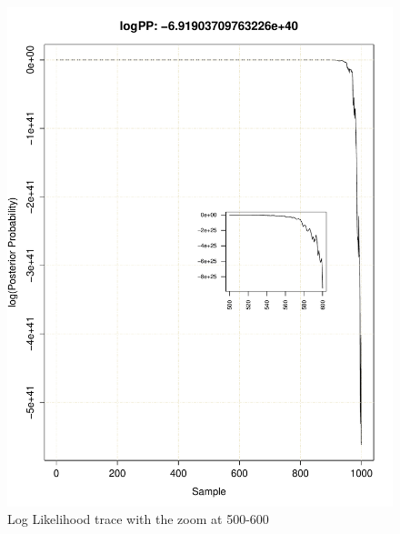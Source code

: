 \documentclass[11pt]{labbook}
\begin{document}
    \begin{figure}
        \centering
        \includegraphics[scale=.75]{FONSE_Plots/2016/June_29/LogLikeTrace_500-600}
        \caption{Log Likelihood trace with the zoom at 500-600}
        \label{fig:JUN29_500-600}
    \end{figure}
\end{document}
